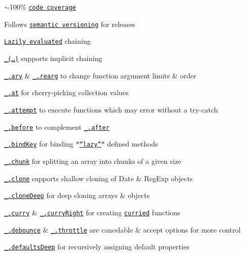 \begin{DoxyItemize}
\item $\sim$100\% \href{https://coveralls.io/r/lodash}{\tt code coverage}
\item Follows \href{http://semver.org/}{\tt semantic versioning} for releases
\item \href{http://filimanjaro.com/blog/2014/introducing-lazy-evaluation/}{\tt Lazily evaluated} chaining
\item \href{https://lodash.com/docs#_}{\tt \+\_\+(…)} supports implicit chaining
\item \href{https://lodash.com/docs#ary}{\tt \+\_\+.\+ary} \& \href{https://lodash.com/docs#rearg}{\tt \+\_\+.\+rearg} to change function argument limits \& order
\item \href{https://lodash.com/docs#at}{\tt \+\_\+.\+at} for cherry-\/picking collection values
\item \href{https://lodash.com/docs#attempt}{\tt \+\_\+.\+attempt} to execute functions which may error without a try-\/catch
\item \href{https://lodash.com/docs#before}{\tt \+\_\+.\+before} to complement \href{https://lodash.com/docs#after}{\tt \+\_\+.\+after}
\item \href{https://lodash.com/docs#bindKey}{\tt \+\_\+.\+bind\+Key} for binding \href{http://michaux.ca/articles/lazy-function-definition-pattern}{\tt $\ast$“lazy”$\ast$} defined methods
\item \href{https://lodash.com/docs#chunk}{\tt \+\_\+.\+chunk} for splitting an array into chunks of a given size
\item \href{https://lodash.com/docs#clone}{\tt \+\_\+.\+clone} supports shallow cloning of {\ttfamily Date} \& {\ttfamily Reg\+Exp} objects
\item \href{https://lodash.com/docs#cloneDeep}{\tt \+\_\+.\+clone\+Deep} for deep cloning arrays \& objects
\item \href{https://lodash.com/docs#curry}{\tt \+\_\+.\+curry} \& \href{https://lodash.com/docs#curryRight}{\tt \+\_\+.\+curry\+Right} for creating \href{http://hughfdjackson.com/javascript/why-curry-helps/}{\tt curried} functions
\item \href{https://lodash.com/docs#debounce}{\tt \+\_\+.\+debounce} \& \href{https://lodash.com/docs#throttle}{\tt \+\_\+.\+throttle} are cancelable \& accept options for more control
\item \href{https://lodash.com/docs#defaultsDeep}{\tt \+\_\+.\+defaults\+Deep} for recursively assigning default properties

\end{DoxyItemize}
